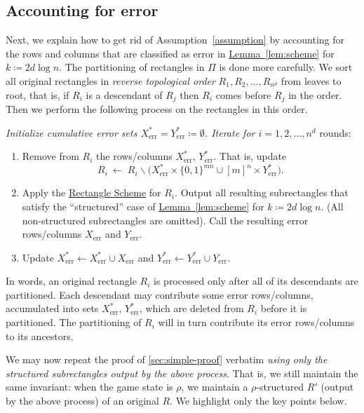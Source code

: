 \documentclass[11pt]{article}
\numberwithin{equation}{section}
\theoremstyle{definition}
\theoremstyle{plain}
\newcommand{\expref}[2]{\hyperref[#2]{#1~\ref{#2}}}
\newcommand{\rectlemma}{\expref{Lemma}{lem:scheme}\xspace}%
\newcommand{\rectscheme}{\hyperref[alg:partition]{Rectangle Scheme}\xspace}
\DeclareMathOperator{\err}{err}
\newcommand{\allX}{[m]^n}
\newcommand{\allY}{\{0,1\}^{mn}}
\begin{document}
\subsection{Accounting for error} \label{sec:error}

Next, we explain how to get rid of
%
Assumption~\ref{assumption}  %
by accounting for the rows and columns that are classified as error in \rectlemma for $k\coloneqq 2d\log n$. The partitioning of
rectangles in $\Pi$ %
is done more
carefully.  %
We sort all original rectangles in \emph{reverse topological order} $R_1,R_2,\ldots,R_{n^d}$ from leaves to root, that is, if $R_i$ is a descendant of $R_j$ then $R_i$ comes before $R_j$ in the order. Then we
perform the following %
process
on %
the rectangles
in this order. %

\medskip\noindent
{\slshape Initialize cumulative error sets $X^*_{\err}=Y^*_{\err}\coloneqq\emptyset$. Iterate for $i=1,2,\ldots,n^d$} rounds:
\begin{enumerate}[topsep=1mm,itemsep=2mm]
\item Remove from $R_i$ the rows/columns $X^*_{\err}$, $Y^*_{\err}$. That is, update
\[
R_i~\leftarrow~
R_i \smallsetminus \big(X^*_{\err}\times \allY \cup \allX\times Y^*_{\err}\big).
\]
\item Apply the \rectscheme for $R_i$. Output all resulting subrectangles that satisfy the ``structured'' case of \rectlemma for $k\coloneqq 2d\log n$. (All non-structured subrectangles are omitted). Call the resulting error rows/columns $X_{\err}$ and $Y_{\err}$.
\item Update $X^*_{\err}\leftarrow X^*_{\err} \cup X_{\err}$ and $Y^*_{\err}\leftarrow Y^*_{\err}\cup Y_{\err}$.
\end{enumerate}

\medskip\noindent
In words, an original rectangle $R_i$ is processed only after all of its descendants are partitioned. Each descendant may contribute some error rows/columns, accumulated into sets $X^*_{\err}$, $Y^*_{\err}$, which are deleted from $R_i$ before it is partitioned. The partitioning of $R_i$ will in turn contribute its error rows/columns to its ancestors.

We may now repeat the proof of \autoref{sec:simple-proof} verbatim \emph{using only the structured subrectangles output by the above process}. That is, we still maintain the same invariant: when the game state is $\rho$, we maintain a $\rho$-structured $R'$ (output by the above process) of an original $R$. We highlight only the key points below.
\end{document}
